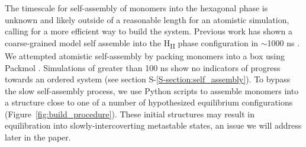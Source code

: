 \documentclass[journal=jpcbfk,manuscript=article]{achemso}
\begin{document}
  The timescale for self-assembly of monomers into the hexagonal phase is
  unknown and likely outside of a reasonable length for an atomistic simulation,
  calling for a more efficient way to build the system. Previous work has shown
  a coarse-grained model self assemble into the H\textsubscript{II} phase
  configuration in $\sim$1000 ns \cite{mondal_self-assembly_2013}.  We
  attempted atomistic self-assembly by packing monomers into a box using Packmol
  \cite{martinez_packmol:_2009}. Simulations of greater than 100 ns show no
  indicators of progress towards an ordered system (see section S-\ref{S-section:self_assembly}). 
  To bypass the slow self-assembly process, we use Python scripts to assemble monomers
  into a structure close to one of a number of hypothesized equilibrium configurations
  (Figure~\ref{fig:build_procedure}).
  These initial structures may result in equilibration into slowly-intercoverting metastable states, an issue we will address later in the paper. 
\end{document}
